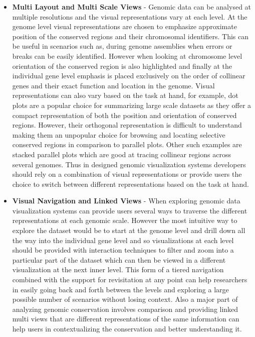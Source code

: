 \begin{itemize}
    \item \textbf{Multi Layout and Multi Scale Views} - 
    Genomic data can be analysed at multiple resolutions and the visual representations vary at each level. At the genome level visual representations are chosen to emphasize  approximate position of the conserved regions and their chromosomal identifiers. This can be useful in scenarios such as, during genome assemblies when errors or breaks can be easily identified. However when looking at chromosome level orientation of the conserved region is also highlighted and finally at the individual gene level emphasis is placed exclusively on the order of collinear genes and their exact function and location in the genome. Visual representations can also vary based on the task at hand, for example, dot plots are a popular choice for summarizing large scale datasets as they offer a compact representation of both the position and orientation of conserved regions. However, their orthogonal representation is difficult to understand making them an unpopular choice for browsing and locating selective conserved regions in comparison to parallel plots. Other such examples are stacked parallel plots which are good at tracing collinear regions across several genomes. Thus in designed genomic visualization systems developers should rely on a combination of visual representations or provide users the choice to switch between different representations based on the task at hand. 

    \item \textbf{Visual Navigation and Linked Views} - When exploring genomic data visualization systems can provide users several ways to traverse the different representations at each genomic scale. However the most intuitive way to explore the dataset would be to start at the genome level and drill down all the way into the individual gene level and so visualizations at each level should be provided with interaction techniques to filter and zoom into a particular part of the dataset which can then be viewed in a different visualization at the next inner level. This form of a tiered navigation combined with the support for revisitation at any point can help researchers in easily going back and forth between the levels and exploring a large possible number of scenarios without losing context. Also a major part of analyzing genomic conservation involves comparison and providing linked multi views that are different representations of the same information can help users in contextualizing the conservation and better understanding it.
    

\end{itemize}
